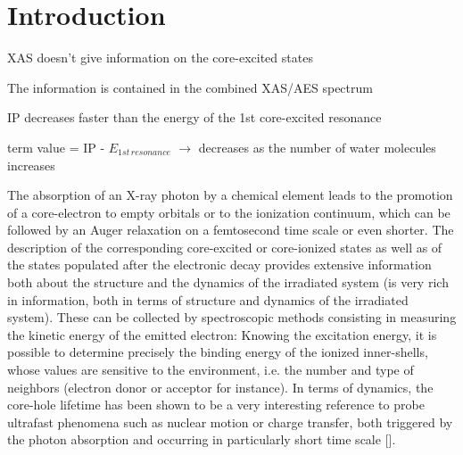 \section{Introduction}

XAS doesn't give information on the core-excited states

The information is contained in the combined XAS/AES spectrum

IP decreases faster than the energy of the 1st core-excited resonance

term value = IP - $E_{1st\,resonance}$ $\rightarrow$ decreases as the number of water molecules increases


The absorption of an X-ray photon by a chemical element leads to the promotion of a core-electron to empty orbitals or to the ionization continuum, which can be followed by an Auger relaxation on a femtosecond time scale or even shorter. The description of the corresponding core-excited or core-ionized states as well as of the states populated after the electronic decay provides extensive information both about the structure and the dynamics of the irradiated system (is very rich in information, both in terms of structure and dynamics of the irradiated system). These can be collected by spectroscopic methods consisting in measuring the kinetic energy of the emitted electron: Knowing the excitation energy, it is possible to determine precisely the binding energy of the ionized inner-shells, whose values are sensitive to the environment, i.e. the number and type of neighbors (electron donor or acceptor for instance). In terms of dynamics, the core-hole lifetime has been shown to be a very interesting  reference to probe ultrafast phenomena such as nuclear motion or charge transfer, both triggered by the photon absorption and occurring in particularly short time scale []. 


